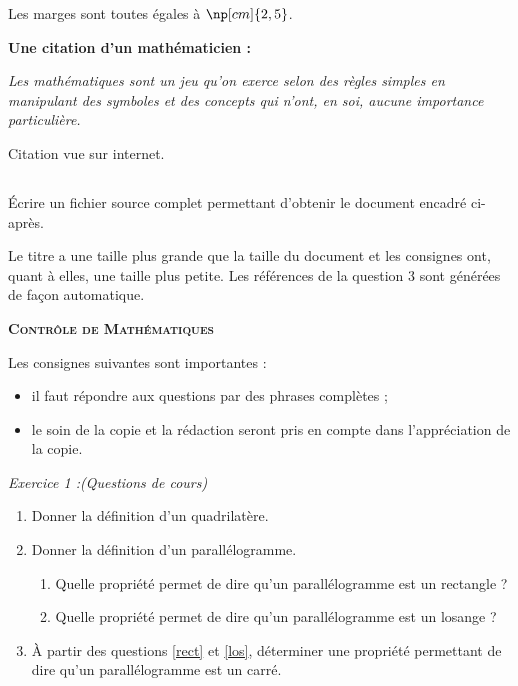 Les marges sont toutes égales à $\np[cm]{2,5}$.\bigskip

\begin{CadreExemple}
    \begin{center}
        \color{blue}\bfseries Une citation d'un mathématicien : 
    \end{center}\medskip

    {\itshape Les mathématiques sont un jeu qu'on exerce selon des règles simples en manipulant des symboles et des concepts qui n'ont, en soi, aucune importance particulière.}\bigskip

    \begin{flushright}
        Citation vue sur internet.
    \end{flushright}
\end{CadreExemple}\bigskip

\subsection*{\ExoFiche}

\'Ecrire un fichier source complet permettant d'obtenir le document encadré ci-après.\par
Le titre a une taille plus grande que la taille du document et les consignes ont, quant à elles, une taille plus petite. Les références de la question 3 sont générées de façon automatique.\bigskip

\begin{CadreExemple}
\reset
\begin{center}
    \scshape\bfseries\Large Contrôle de Mathématiques
\end{center}\bigskip

{\small
Les consignes suivantes sont importantes :
\begin{itemize}
    \item il faut répondre aux questions par des phrases complètes ;
    \item le soin de la copie et la rédaction seront pris en compte dans l'appréciation de la copie.
\end{itemize}}\bigskip

\textit{Exercice 1 :\hfill (Questions de cours)}

\begin{enumerate}
    \item Donner la définition d'un quadrilatère.
    \item Donner la définition d'un parallélogramme.
        \begin{enumerate}
            \item Quelle propriété permet de dire qu'un parallélogramme est un rectangle ?\label{rect}
            \item Quelle propriété permet de dire qu'un parallélogramme est un losange ?\label{los}
        \end{enumerate}
    \item À partir des questions \ref{rect} et \ref{los}, déterminer une propriété permettant de dire qu'un parallélogramme est un carré.
\end{enumerate}
\end{CadreExemple} 